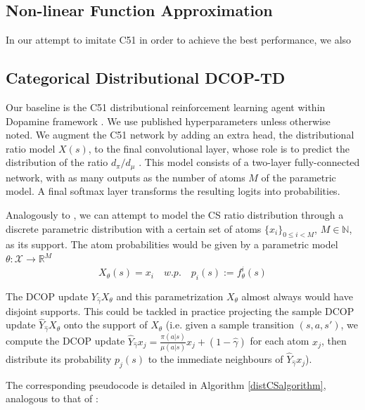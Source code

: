 \documentclass[12pt,a4paper,openright,twoside]{article}
\numberwithin{equation}{section}
\theoremstyle{definition}
\theoremstyle{remark}
\theoremstyle{plain}
\begin{document}
\subsection{Non-linear Function Approximation}

In our attempt to imitate C51 in order to achieve the best performance, we also 



\subsection{Categorical Distributional DCOP-TD}

Our baseline is the C51 distributional reinforcement learning agent\cite{DRL} within Dopamine framework \cite{dopamine}. We use published hyperparameters unless otherwise noted. We augment the C51 network by adding an extra head, the distributional ratio model $X(s)$, to the final convolutional layer, whose role is to predict the distribution of the ratio $d_\pi / d_\mu$ . This model consists of a two-layer fully-connected network, with as many outputs as the number of atoms $M$ of the parametric model. A final softmax layer transforms the resulting logits into probabilities. 

Analogously to \cite{DRL}, we can attempt to model the CS ratio distribution through a discrete parametric distribution with a certain set of atoms $\{x_i\}_{0 \leq i<M}$, $M \in \mathbb{N}$, as its support. The atom probabilities would be given by a parametric model $\theta : \mathcal{X} \rightarrow \mathbb{R}^M$
\begin{equation}
    X_{\theta} (s) = x_i \quad w.p. \quad p_i(s) := f_{\theta}^i(s)
\end{equation}

The DCOP update $Y_{\hat{\gamma}}X_\theta$ and this parametrization $X_\theta$ almost always would have disjoint supports. This could be tackled in practice projecting the sample DCOP update $\hat{Y}_{\hat{\gamma}}X_\theta$ onto the support of $X_\theta$ (i.e. given a sample transition $(s,a,s')$, we compute the DCOP update $\hat{Y}_{\hat{\gamma}}x_j =  \frac{\pi(a|s)}{\mu(a|s)}x_j + (1-\hat{\gamma})$ for each atom $x_j$, then distribute its probability $p_j(s)$ to the immediate neighbours of $\hat{Y}_{\hat{\gamma}}x_j$).

The corresponding pseudocode is detailed in Algorithm \ref{distCSalgorithm}, analogous to that of \cite{DRL}:
\end{document}
